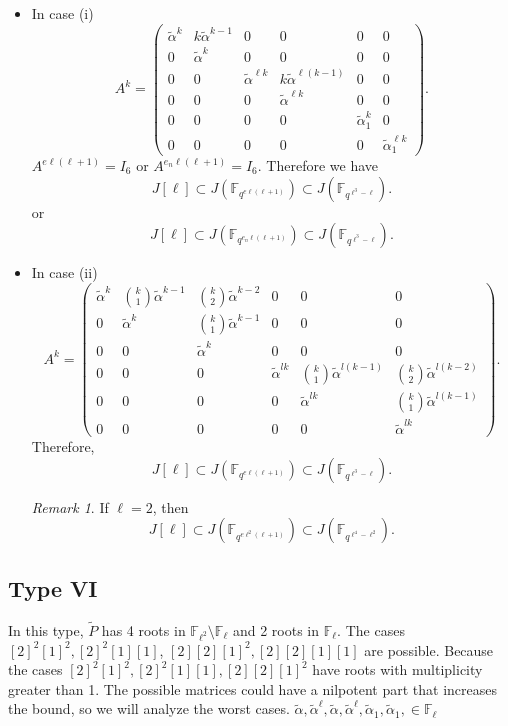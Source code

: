 \documentclass[11pt,a4paper]{article}
\theoremstyle{plain}
\theoremstyle{definition}
\theoremstyle{remark}
\newtheorem{remark}[theorem]{Remark}
\begin{document}
\begin{itemize}
    \item[(i)] In case (i) \[
A^k =
\begin{pmatrix}
\tilde{\alpha}^{k} & k\tilde{\alpha}^{k-1} & 0 & 0 & 0 & 0\\
0 & \tilde{\alpha}^{k} & 0 & 0 & 0 & 0\\
0 & 0 & \tilde{\alpha}^{\ell k} & k\tilde{\alpha}^{\ell(k-1)} & 0 & 0\\
0 & 0 & 0 & \tilde{\alpha}^{\ell k} & 0 & 0\\
0 & 0 & 0 & 0 & \tilde{\alpha}_1^{k} & 0\\
0 & 0 & 0 & 0 & 0 & \tilde{\alpha}_1^{\ell k}
\end{pmatrix}.
\]
$A^{e\ell(\ell+1)} = I_{6}$
 or 
$A^{e_n\ell(\ell+1)} = I_{6}  $. 
 Therefore we have
\[
J[\ell] \subset J(\mathbb{F}_{q^{e\ell(\ell+1)}}) \subset J(\mathbb{F}_{q^{\ell^3-\ell}}).
\]
or \[
J[\ell] \subset J(\mathbb{F}_{q^{e_n\ell(\ell+1)}}) \subset J(\mathbb{F}_{q^{\ell^3-\ell}}).
\]
 \item[(ii)] In case (ii) 
 \[
A^k =
\begin{pmatrix}
\tilde{\alpha}^{k} &
\binom{k}{1}\tilde{\alpha}^{k-1} &
\binom{k}{2}\tilde{\alpha}^{k-2} &
0 & 0 & 0 \\

0 &
\tilde{\alpha}^{k} &
\binom{k}{1}\tilde{\alpha}^{k-1} &
0 & 0 & 0 \\

0 & 0 &
\tilde{\alpha}^{k} &
0 & 0 & 0 \\[0.4em]

0 & 0 & 0 &
\tilde{\alpha}^{lk} &
\binom{k}{1}\tilde{\alpha}^{l(k-1)} &
\binom{k}{2}\tilde{\alpha}^{l(k-2)} \\

0 & 0 & 0 & 0 &
\tilde{\alpha}^{lk} &
\binom{k}{1}\tilde{\alpha}^{l(k-1)} \\

0 & 0 & 0 & 0 & 0 &
\tilde{\alpha}^{lk}
\end{pmatrix}.
\]
Therefore,
\[
J[\ell] \subset J(\mathbb{F}_{q^{e\ell(\ell+1)}}) \subset J(\mathbb{F}_{q^{\ell^3-\ell}}) .
\]
\begin{remark}
If $\ell= 2$, then
    \[
J[\ell] \subset J(\mathbb{F}_{q^{e\ell^2(\ell+1)}}) \subset J(\mathbb{F}_{q^{\ell^4-\ell^2}}) .
\]
\end{remark} 
\end{itemize}

\subsection*{Type VI}
In this type, $\tilde{P}$  has 4 roots in $ \mathbb{F}_{\ell^2} \setminus \mathbb{F}_\ell$ and 2 roots in $\mathbb{F}_\ell$.   
The cases  $[2]^2[1]^2, [2]^2[1][1]$, $ [2][2][1]^2,[2][2][1][1] $  are possible.
Because the cases $[2]^2[1]^2,[2]^2[1][1], [2][2][1]^2$  have roots with multiplicity greater than 1. The possible matrices could have a nilpotent part that increases the bound, so we will analyze the worst cases.
 $\tilde{\alpha}, \tilde{\alpha}^\ell, \tilde{\alpha}, \tilde{\alpha}^\ell, \tilde{\alpha}_1, \tilde{\alpha}_1, \in  \mathbb{F}_\ell$ 
\end{document}
